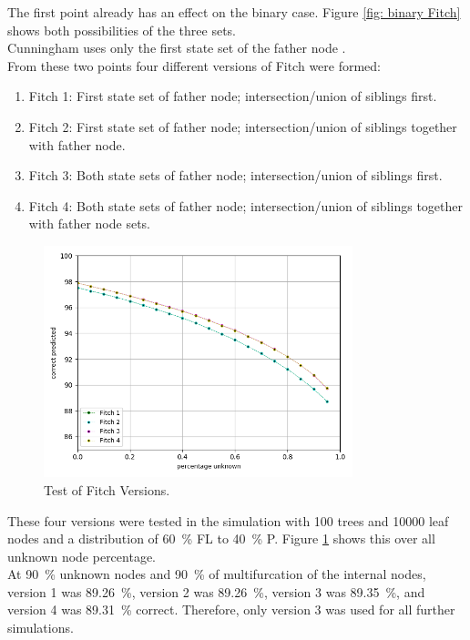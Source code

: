         The first point already has an effect on the binary case. Figure \ref{fig: binary Fitch} shows 
          both possibilities of the three sets. \\
        Cunningham uses only the first state set of the father node \cite{Cunningham1998}. \\
        From these two points four different versions of Fitch were formed:
        \begin{enumerate}
          \item Fitch 1: First state set of father node; intersection/union of siblings first.
          \item Fitch 2: First state set of father node; intersection/union of siblings together with father node.
          \item Fitch 3: Both state sets of father node; intersection/union of siblings first.
          \item Fitch 4: Both state sets of father node; intersection/union of siblings together with father node sets.
        \end{enumerate}
        \begin{figure}
          \centering
          \includegraphics[width=0.8\textwidth]{Figures/simulation_fitch_evaluation.png}
          \caption{Test of Fitch Versions.}
          \label{fig:Fitch versions}
        \end{figure}
        These four versions were tested in the simulation with 100 trees and 10000 leaf nodes and a
          distribution of 60~\% FL to 40~\% P. Figure \ref{fig:Fitch versions} shows this over all unknown 
          node percentage. \\
        At 90~\% unknown nodes and 90~\% of multifurcation of the internal nodes, version 1 was 89.26~\%, 
          version 2 was 89.26~\%, version 3 was 89.35~\%, and version 4 was 89.31~\% correct. Therefore, 
          only version 3 was used for all further simulations.



